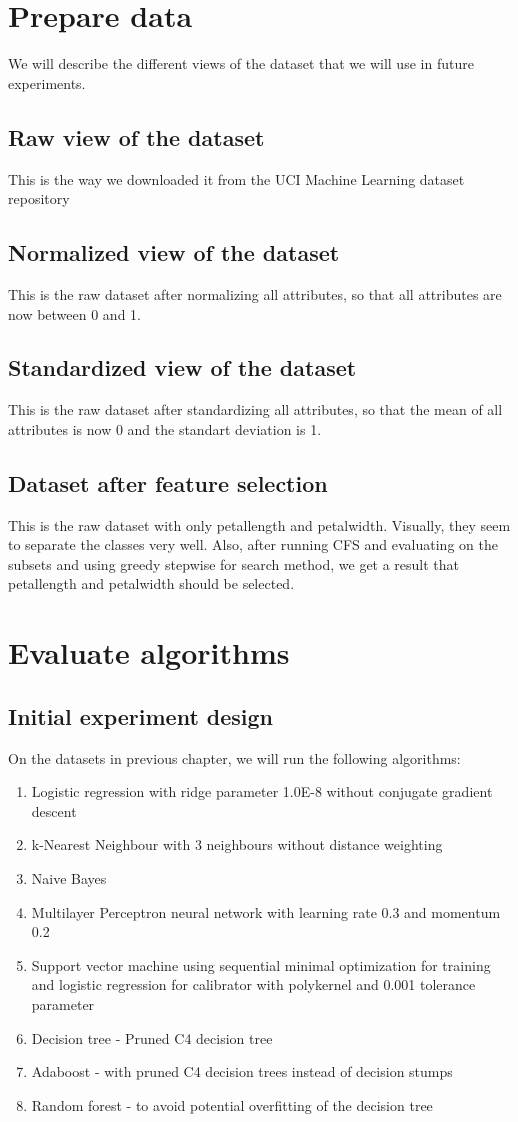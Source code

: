 \chapter{Prepare data}
We will describe the different views of the dataset that we will use in future experiments.
\section{Raw view of the dataset}
This is the way we downloaded it from the UCI Machine Learning dataset repository
\section{Normalized view of the dataset}
This is the raw dataset after normalizing all attributes, so that all attributes are now between 0 and 1.
\section{Standardized view of the dataset}
This is the raw dataset after standardizing all attributes, so that the mean of all attributes is now 0 and the standart deviation is 1.
\section{Dataset after feature selection}
This is the raw dataset with only petallength and petalwidth. Visually, they seem to separate the classes very well. Also, after running CFS and evaluating on the subsets and using greedy stepwise for search method, we get a result that petallength and petalwidth should be selected.

\chapter{Evaluate algorithms}
\section{Initial experiment design}
On the datasets in previous chapter, we will run the following algorithms:
\begin{enumerate}
    \item Logistic regression with ridge parameter 1.0E-8 without conjugate gradient descent
    \item k-Nearest Neighbour with 3 neighbours without distance weighting
    \item Naive Bayes
    \item Multilayer Perceptron neural network with learning rate 0.3 and momentum 0.2
    \item Support vector machine using sequential minimal optimization for training and logistic regression for calibrator with polykernel and 0.001 tolerance parameter
    \item Decision tree - Pruned C4 decision tree
    \item Adaboost - with pruned C4 decision trees instead of decision stumps
    \item Random forest - to avoid potential overfitting of the decision tree
\end{enumerate}

